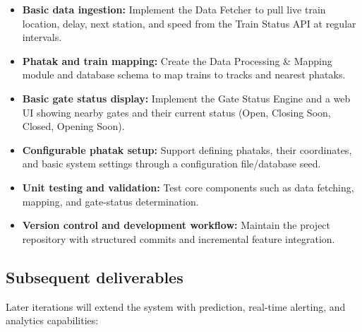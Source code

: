 \documentclass[11pt,a4paper]{article}
\begin{document}
\begin{itemize}
    \item \textbf{Basic data ingestion:} Implement the Data Fetcher to pull live train location, delay, next station, and speed from the Train Status API at regular intervals.

    \item \textbf{Phatak and train mapping:} Create the Data Processing \& Mapping module and database schema to map trains to tracks and nearest phataks.

    \item \textbf{Basic gate status display:} Implement the Gate Status Engine and a web UI showing nearby gates and their current status (Open, Closing Soon, Closed, Opening Soon).

    \item \textbf{Configurable phatak setup:} Support defining phataks, their coordinates, and basic system settings through a configuration file/database seed.

    \item \textbf{Unit testing and validation:} Test core components such as data fetching, mapping, and gate-status determination.

    \item \textbf{Version control and development workflow:} Maintain the project repository with structured commits and incremental feature integration.
\end{itemize}


\subsection{Subsequent deliverables}

Later iterations will extend the system with prediction, real-time alerting, and analytics capabilities:
\end{document}
